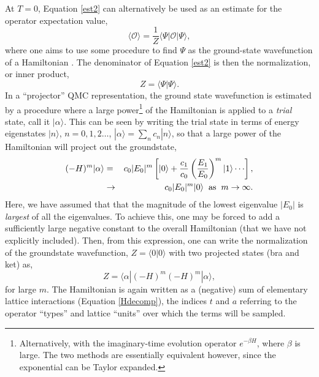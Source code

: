 \documentclass[vecphys]{svmult}
\begin{document}
At $T=0$, Equation \ref{est2} can alternatively be used as an estimate for the operator expectation value,
\begin{equation}
\langle \mathcal{O} \rangle  = \frac{1}{Z} \langle \Psi | \mathcal{O} | \Psi \rangle, \label{zeroExpet}
\end{equation}
where one aims to use some procedure to find $\Psi$ as the ground-state wavefunction of a Hamiltonian \cite{Melko:Sandvik05}.  
The denominator of Equation \ref{est2} is then the normalization, or inner product,
\begin{equation}
Z =  \langle \Psi | \Psi \rangle.
\end{equation}
In a ``projector'' QMC representation, the ground state wavefunction is estimated by a procedure where a large power\footnote{Alternatively, with the imaginary-time evolution operator $e^{-\beta H}$, where $\beta$ is large.  The two methods are essentially equivalent however, since the exponential can be Taylor expanded.} of the Hamiltonian is applied to a {\it trial} state, call it $|\alpha \rangle$.  This can be seen by writing the trial state in terms of energy eigenstates $|n \rangle$, $n=0,1,2 \ldots$,
$|\alpha \rangle= \sum_n c_n |n \rangle$, so that 
a large power of the Hamiltonian will project out the groundstate,
\begin{eqnarray}
(-H)^m |\alpha \rangle &=& c_0|E_0|^m \left[{  |0 \rangle + \frac{c_1}{c_0} \left({ \frac{E_1}{E_0} }\right)^m|1 \rangle \cdots  }\right], \\
&\rightarrow& c_0|E_0|^m |0 \rangle \hspace{2mm} {\rm as} \hspace{2mm} m \rightarrow \infty. \nonumber
\end{eqnarray}
Here, we have assumed that that the magnitude of the lowest eigenvalue $|E_0|$ is {\it largest} of all the eigenvalues.  To achieve this, one may be forced to add a sufficiently large negative constant to the overall Hamiltonian (that we have not explicitly included).
Then, from this expression, one can write the normalization of the groundstate wavefunction, $Z=\langle 0 | 0 \rangle$ with two projected states (bra and ket) as,
\begin{equation}
Z = \langle \alpha | (-H)^m (-H)^m | \alpha \rangle, \label{normZ2}
\end{equation}
for large $m$.  
The Hamiltonian is again written as a (negative) sum of elementary lattice interactions (Equation \ref{Hdecomp}), the indices $t$ and $a$ referring to the operator ``types'' and lattice ``units'' over which the terms will be sampled.  
\end{document}
